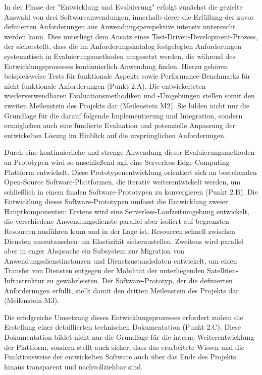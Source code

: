 In der Phase der "Entwicklung und Evaluierung" erfolgt zunächst die gezielte Auswahl von drei Softwareanwendungen, innerhalb derer die Erfüllung der zuvor definierten Anforderungen aus Anwendungsperspektive intensiv untersucht werden kann.
Dies unterliegt dem Ansatz eines Test-Driven-Development-Prozess, der sicherstellt, dass die im Anforderungskatalog festgelegten Anforderungen systematisch in Evaluierungsmethoden umgesetzt werden, die während des Entwicklungsprozesses kontinuierlich Anwendung finden.
Hierzu gehören beispielsweise Tests für funktionale Aspekte sowie Performance-Benchmarks für nicht-funktionale Anforderungen (Punkt 2.A).
Die entwickelteten wiederverwendbaren Evaluationsmethodiken und -Umgebungen stellen somit den zweiten Meilenstein des Projekts dar (Meilenstein M2).
Sie bilden nicht nur die Grundlage für die darauf folgende Implementierung und Integration, sondern ermöglichen auch eine fundierte Evaluation und potenzielle Anpassung der entwickelten Lösung im Hinblick auf die ursprünglichen Anforderungen.

Durch eine kontinuierliche und strenge Anwendung dieser Evaluierungsmethoden an Prototypen wird so anschließend agil eine Serverless Edge-Computing Plattform entwickelt.
Diese Prototypenentwicklung orientiert sich an bestehenden Open-Source Software-Plattformen, die iterativ weiterentwickelt werden, um schließlich in einem finalen Software-Prototypen zu konvergieren (Punkt 2.B).
Die Entwicklung dieses Software-Prototypen umfasst die Entwicklung zweier Hauptkomponenten:
Erstens wird eine Serverless-Laufzeitumgebung entwickelt, die verschiedene Anwendungsdienste parallel aber isoliert auf begrenzten Resourcen ausführen kann und in der Lage ist, Resourcen schnell zwischen Diensten auszutauschen um Elastizität sicherzustellen.
Zweitens wird parallel aber in enger Absprache ein Subsystem zur Migration von Anwendungsdienstinstanzen und Dienstzustandsdaten entwickelt, um einen Transfer von Diensten entgegen der Mobilität der unterliegenden Satelliten-Infrastruktur zu gewährleisten.
Der Software-Prototyp, der die definierten Anforderungen erfüllt, stellt damit den dritten Meilenstein des Projekts dar (Meilenstein M3).

Die erfolgreiche Umsetzung dieses Entwicklungsprozesses erfordert zudem die Erstellung einer detaillierten technischen Dokumentation (Punkt 2.C).
Diese Dokumentation bildet nicht nur die Grundlage für die interne Weiterentwicklung der Plattform, sondern stellt auch sicher, dass das erarbeitete Wissen und die Funktionsweise der entwickelten Software auch über das Ende des Projekts hinaus transparent und nachvollziehbar sind.

